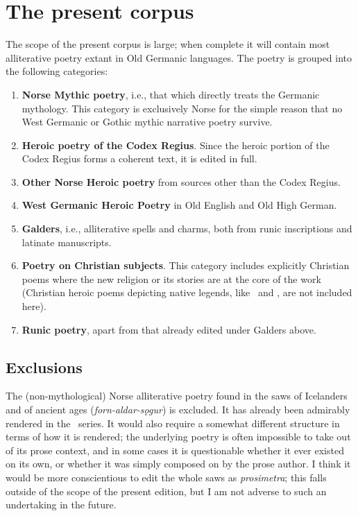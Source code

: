 \section{The present corpus}
  The scope of the present corpus is large; when complete it will contain most alliterative poetry extant in Old Germanic languages.  The poetry is grouped into the following categories:
  \begin{enumerate}
    \item \textbf{Norse Mythic poetry}, i.e., that which directly treats the Germanic mythology.  This category is exclusively Norse for the simple reason that no West Germanic or Gothic mythic narrative poetry survive.
    \item \textbf{Heroic poetry of the Codex Regius}.  Since the heroic portion of the Codex Regius forms a coherent text, it is edited in full.
    \item \textbf{Other Norse Heroic poetry} from sources other than the Codex Regius.
    \item \textbf{West Germanic Heroic Poetry} in Old English and Old High German.
    \item \textbf{Galders}, i.e., alliterative spells and charms, both from runic inscriptions and latinate manuscripts.
    \item \textbf{Poetry on Christian subjects}.  This category includes explicitly Christian poems where the new religion or its stories are at the core of the work (Christian heroic poems depicting native legends, like \Beowulf\ and \Hildebrandslied, are not included here).
    \item \textbf{Runic poetry}, apart from that already edited under Galders above.
  \end{enumerate}

  \subsection{Exclusions}
    The (non-mythological) Norse alliterative poetry found in the saws of Icelanders and of ancient ages (\emph{forn-aldar-sǫgur}) is excluded.  It has already been admirably rendered in the \Skp\ series.  It would also require a somewhat different structure in terms of how it is rendered; the underlying poetry is often impossible to take out of its prose context, and in some cases it is questionable whether it ever existed on its own, or whether it was simply composed on by the prose author.  I think it would be more conscientious to edit the whole saws as \emph{prosimetra}; this falls outside of the scope of the present edition, but I am not adverse to such an undertaking in the future.

